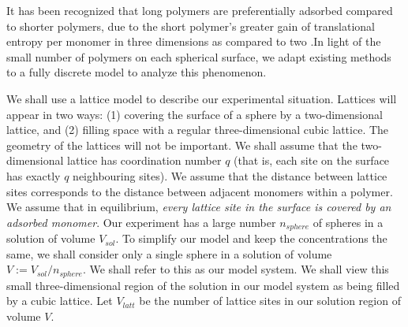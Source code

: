 \documentclass[journal=mamobx,manuscript=article]{achemso}
\begin{document}
It has been recognized that long polymers are
preferentially adsorbed compared to shorter polymers,
due to the short polymer's greater gain of
translational entropy per monomer in three dimensions
as compared to two 
\cite{Fleer1993}.In light of the small number of polymers on each
spherical surface, we adapt existing methods to a
fully discrete model to analyze this phenomenon.

We shall use a lattice model to describe our experimental situation.  
Lattices will appear in two ways:  (1) covering the surface of a sphere by a two-dimensional lattice, and
(2) filling space with a regular three-dimensional cubic lattice.  
The geometry of the lattices will not be important.  
We shall assume that the two-dimensional lattice has coordination number $q$ 
(that is, each site on the surface has exactly $q$ neighbouring sites).  We assume that 
the distance between lattice sites corresponds to the distance between adjacent monomers within a 
polymer.  We assume that in equilibrium, \textit{every lattice site in the surface is covered by an adsorbed 
monomer}.
Our experiment has a large number $n_{sphere}$ of spheres in a solution of volume $V_{sol}$.  To simplify 
our model and keep the concentrations the same, we shall consider only a single sphere in a solution
of volume $V:=V_{sol}/n_{sphere}$.  We shall refer to this as our model system.
We shall view this small three-dimensional region of the solution in our model system as being filled by a 
cubic lattice.
Let $V_{latt}$ be the number of lattice sites in our solution region of volume $V$.




\end{document}
